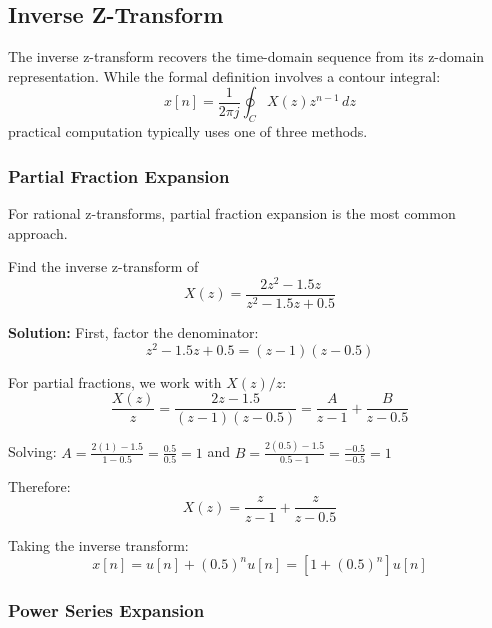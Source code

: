 \subsection{Inverse Z-Transform}

The inverse z-transform recovers the time-domain sequence from its z-domain representation. While the formal definition involves a contour integral:
\begin{equation}
x[n] = \frac{1}{2\pi j} \oint_C X(z) z^{n-1} \, dz
\end{equation}
practical computation typically uses one of three methods.

\subsubsection{Partial Fraction Expansion}

For rational z-transforms, partial fraction expansion is the most common approach.

\begin{examplebox}
Find the inverse z-transform of
\begin{equation}
X(z) = \frac{2z^2 - 1.5z}{z^2 - 1.5z + 0.5}
\end{equation}

\textbf{Solution:} First, factor the denominator:
\begin{equation}
z^2 - 1.5z + 0.5 = (z - 1)(z - 0.5)
\end{equation}

For partial fractions, we work with $X(z)/z$:
\begin{equation}
\frac{X(z)}{z} = \frac{2z - 1.5}{(z-1)(z-0.5)} = \frac{A}{z-1} + \frac{B}{z-0.5}
\end{equation}

Solving: $A = \frac{2(1) - 1.5}{1 - 0.5} = \frac{0.5}{0.5} = 1$ and $B = \frac{2(0.5) - 1.5}{0.5 - 1} = \frac{-0.5}{-0.5} = 1$

Therefore:
\begin{equation}
X(z) = \frac{z}{z-1} + \frac{z}{z-0.5}
\end{equation}

Taking the inverse transform:
\begin{equation}
x[n] = u[n] + (0.5)^n u[n] = [1 + (0.5)^n] u[n]
\end{equation}
\end{examplebox}

\subsubsection{Power Series Expansion}

